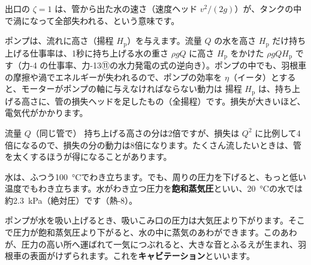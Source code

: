 \noindent 出口の $\zeta=1$ は、管から出た水の速さ（速度ヘッド $v^2/(2g)$）が、タンクの中で渦になって全部失われる、という意味です。

\label{ph:力-14:sec10}ポンプは、流れに高さ（揚程 $H_{\mathrm p}$）を与えます。流量 $Q$ の水を高さ $H_{\mathrm p}$ だけ持ち上げる仕事率は、1秒に持ち上げる水の重さ $\rho gQ$ に高さ $H_{\mathrm p}$ をかけた $\rho gQH_{\mathrm p}$ です（力-4 の仕事率、力-13⑪の水力発電の式の逆向き）。ポンプの中でも、羽根車の摩擦や渦でエネルギーが失われるので、ポンプの効率を $\eta$（イータ）とすると、モーターがポンプの軸に与えなければならない動力は
\noindent 揚程 $H_{\mathrm p}$ は、持ち上げる高さに、管の損失ヘッドを足したもの（全揚程）です。損失が大きいほど、電気代がかかります。

\begin{phbaisuru}{流量 $Q$（同じ管で）}
持ち上げる高さの分は2倍ですが、損失は $Q^2$ に比例して4倍になるので、損失の分の動力は8倍になります。たくさん流したいときは、管を太くするほうが得になることがあります。
\end{phbaisuru}

\label{ph:力-14:sec11}水は、ふつう\qty{100}{\celsius}でわき立ちます。でも、周りの圧力を下げると、もっと低い温度でもわき立ちます。水がわき立つ圧力を\textbf{飽和蒸気圧}といい、\qty{20}{\celsius}の水では約\qty{2.3}{kPa}（絶対圧）です（熱-8）。

ポンプが水を吸い上げるとき、吸いこみ口の圧力は大気圧より下がります。そこで圧力が飽和蒸気圧より下がると、水の中に蒸気のあわができます。このあわが、圧力の高い所へ運ばれて一気につぶれると、大きな音とふるえが生まれ、羽根車の表面がけずられます。これを\textbf{キャビテーション}といいます。

